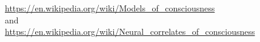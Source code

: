 \documentclass[a4paper]{article}
\title{}
\date{}
\begin{document}
    \maketitle
    \url{https://en.wikipedia.org/wiki/Models_of_consciousness} 
    \\ 
    and
    \\
    \url{https://en.wikipedia.org/wiki/Neural_correlates_of_consciousness}
\end{document}
